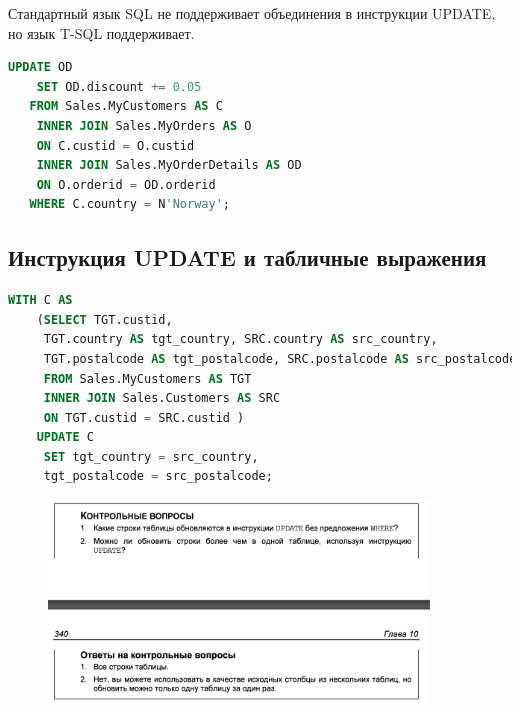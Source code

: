 Стандартный язык SQL не поддерживает объединения в инструкции UPDATE, но
язык T-SQL поддерживает.

\begin{lstlisting}[label=lst:funcReturn, language=sql]
	UPDATE OD
	SET OD.discount += 0.05
   FROM Sales.MyCustomers AS C
	INNER JOIN Sales.MyOrders AS O
	ON C.custid = O.custid
	INNER JOIN Sales.MyOrderDetails AS OD
	ON O.orderid = OD.orderid
   WHERE C.country = N'Norway'; 
\end{lstlisting}


\subsection{Инструкция UPDATE и табличные выражения}

\begin{lstlisting}[label=lst:funcReturn, language=sql]
	WITH C AS
	(SELECT TGT.custid,
	 TGT.country AS tgt_country, SRC.country AS src_country,
	 TGT.postalcode AS tgt_postalcode, SRC.postalcode AS src_postalcode
	 FROM Sales.MyCustomers AS TGT
	 INNER JOIN Sales.Customers AS SRC
	 ON TGT.custid = SRC.custid )
	UPDATE C
	 SET tgt_country = src_country,
	 tgt_postalcode = src_postalcode;
\end{lstlisting}


\begin{figure}[h!]
	\begin{center}
		\includegraphics[width=0.9\textwidth]{img/control22.png}
	\end{center}
	\captionsetup{justification=centering}
\end{figure}



